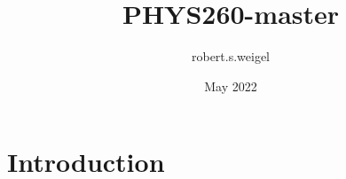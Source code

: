 \documentclass{article}
\title{PHYS260-master}
\author{robert.s.weigel }
\date{May 2022}
\begin{document}
\maketitle

\section{Introduction}
\end{document}

